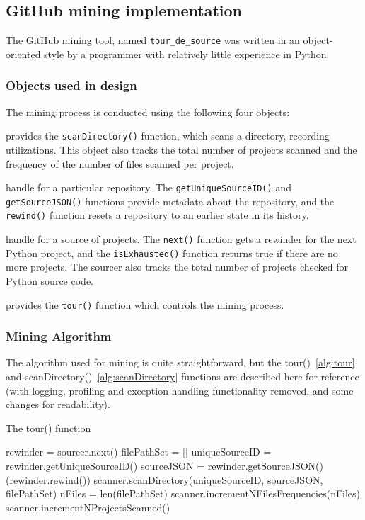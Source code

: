 \subsection{GitHub mining implementation}
\label{sec:miningImplementation}

The GitHub mining tool, named {\tt tour\_de\_source} was written in an object-oriented style by a programmer with relatively little experience in Python.

\subsubsection{Objects used in design}
The mining process is conducted using the following four objects:
\begin{description} \itemsep -1pt
\item[Scanner] provides the {\tt scanDirectory()} function, which scans a directory, recording utilizations.  This object also tracks the total number of projects scanned and the frequency of the number of files scanned per project.
\item[Rewinder] handle for a particular repository. The {\tt getUniqueSourceID()} and {\tt getSourceJSON()} functions provide metadata about the repository, and the {\tt rewind()} function resets a repository to an earlier state in its history.
\item[Sourcer] handle for a source of projects.  The {\tt next()} function gets a rewinder for the next Python project, and the {\tt isExhausted()} function returns true if there are no more projects.  The sourcer also tracks the total number of projects checked for Python source code.
\item[Tourist] provides the {\tt tour()} function which controls the mining process.
\end{description}

\subsubsection{Mining Algorithm}
The algorithm used for mining is quite straightforward, but the tour()~\ref{alg:tour} and scanDirectory()~\ref{alg:scanDirectory} functions are described here for reference (with logging, profiling and exception handling functionality removed, and some changes for readability).

\begin{algorithm}
  \caption{The tour() function}\label{alg:tour}
  \begin{algorithmic}[1]
 \label{line:isExhausted}
    \State rewinder = sourcer.next() \label{line:next}
    \State filePathSet = []
    \State uniqueSourceID = rewinder.getUniqueSourceID()
    \State sourceJSON = rewinder.getSourceJSON()
    \While (rewinder.rewind()) \label{line:rewind}
        \State scanner.scanDirectory(uniqueSourceID, sourceJSON, filePathSet)\label{line:scanDirectory}
    \EndWhile
    \State nFiles = len(filePathSet)
    \State scanner.incrementNFilesFrequencies(nFiles)\label{line:fileFrequencies}
    \State scanner.incrementNProjectsScanned()\label{line:projectScannedCount}
\EndWhile
\end{algorithmic}
\end{algorithm}


